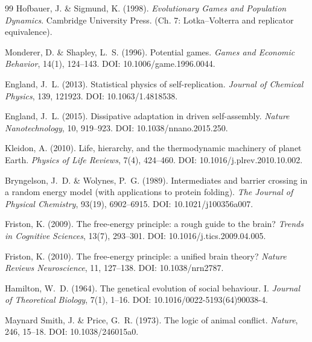 \documentclass[12pt,a4paper]{article}
\theoremstyle{remark}
\begin{document}
\begin{thebibliography}{99}
Hofbauer, J. \& Sigmund, K. (1998).
\newblock \textit{Evolutionary Games and Population Dynamics}.
\newblock Cambridge University Press. (Ch. 7: Lotka--Volterra and replicator equivalence).

Monderer, D. \& Shapley, L.~S. (1996).
\newblock Potential games.
\newblock \textit{Games and Economic Behavior}, 14(1), 124--143.
\newblock DOI: 10.1006/game.1996.0044.

England, J.~L. (2013).
\newblock Statistical physics of self-replication.
\newblock \textit{Journal of Chemical Physics}, 139, 121923.
\newblock DOI: 10.1063/1.4818538.

England, J.~L. (2015).
\newblock Dissipative adaptation in driven self-assembly.
\newblock \textit{Nature Nanotechnology}, 10, 919--923.
\newblock DOI: 10.1038/nnano.2015.250.

Kleidon, A. (2010).
\newblock Life, hierarchy, and the thermodynamic machinery of planet Earth.
\newblock \textit{Physics of Life Reviews}, 7(4), 424--460.
\newblock DOI: 10.1016/j.plrev.2010.10.002.

Bryngelson, J.~D. \& Wolynes, P.~G. (1989).
\newblock Intermediates and barrier crossing in a random energy model (with applications to protein folding).
\newblock \textit{The Journal of Physical Chemistry}, 93(19), 6902--6915.
\newblock DOI: 10.1021/j100356a007.

Friston, K. (2009).
\newblock The free-energy principle: a rough guide to the brain?
\newblock \textit{Trends in Cognitive Sciences}, 13(7), 293--301.
\newblock DOI: 10.1016/j.tics.2009.04.005.

Friston, K. (2010).
\newblock The free-energy principle: a unified brain theory?
\newblock \textit{Nature Reviews Neuroscience}, 11, 127--138.
\newblock DOI: 10.1038/nrn2787.

Hamilton, W.~D. (1964).
\newblock The genetical evolution of social behaviour. I.
\newblock \textit{Journal of Theoretical Biology}, 7(1), 1--16.
\newblock DOI: 10.1016/0022-5193(64)90038-4.

Maynard Smith, J. \& Price, G.~R. (1973).
\newblock The logic of animal conflict.
\newblock \textit{Nature}, 246, 15--18.
\newblock DOI: 10.1038/246015a0.


\end{thebibliography}
\end{document}
